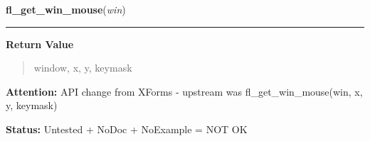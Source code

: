 \hspace{.8\funcindent}\begin{boxedminipage}{\funcwidth}

    \raggedright \textbf{fl\_get\_win\_mouse}(\textit{win})

    \vspace{-1.5ex}

    \rule{\textwidth}{0.5\fboxrule}
\setlength{\parskip}{2ex}
\setlength{\parskip}{1ex}
      \textbf{Return Value}
    \vspace{-1ex}

      \begin{quote}
      window, x, y, keymask

      \end{quote}

\textbf{Attention:} API change from XForms - upstream was fl\_get\_win\_mouse(win, x, y, 
keymask)



\textbf{Status:} Untested + NoDoc + NoExample = NOT OK



    \end{boxedminipage}

    \label{xformslib:library:fl_get_form_mouse}

    \vspace{0.5ex}

